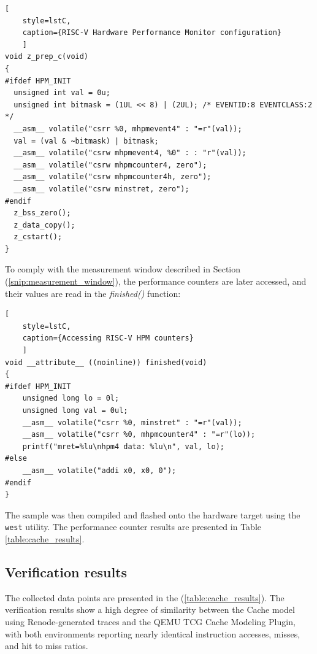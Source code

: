 \begin{center}
\centering
\begin{minipage}{\linewidth}
\begin{lstlisting}[
	style=lstC,
    caption={RISC-V Hardware Performance Monitor configuration}
    ]
void z_prep_c(void)
{
#ifdef HPM_INIT
  unsigned int val = 0u;
  unsigned int bitmask = (1UL << 8) | (2UL); /* EVENTID:8 EVENTCLASS:2 */
  __asm__ volatile("csrr %0, mhpmevent4" : "=r"(val));
  val = (val & ~bitmask) | bitmask;
  __asm__ volatile("csrw mhpmevent4, %0" : : "r"(val));
  __asm__ volatile("csrw mhpmcounter4, zero");
  __asm__ volatile("csrw mhpmcounter4h, zero");
  __asm__ volatile("csrw minstret, zero");
#endif
  z_bss_zero();
  z_data_copy();
  z_cstart();
}
\end{lstlisting}
\end{minipage}
\end{center}

\noindent To comply with the measurement window described in Section (\ref{snip:measurement_window}), the performance counters are later accessed, and their values are read in the
\textit{finished()} function:

\begin{center}
\centering
\begin{minipage}{\linewidth}
\begin{lstlisting}[
	style=lstC,
    caption={Accessing RISC-V HPM counters}
    ]
void __attribute__ ((noinline)) finished(void)
{
#ifdef HPM_INIT
    unsigned long lo = 0l;
    unsigned long val = 0ul;
    __asm__ volatile("csrr %0, minstret" : "=r"(val));
    __asm__ volatile("csrr %0, mhpmcounter4" : "=r"(lo));
    printf("mret=%lu\nhpm4 data: %lu\n", val, lo);
#else
	__asm__ volatile("addi x0, x0, 0");
#endif
}
\end{lstlisting}
\end{minipage}
\end{center}

\noindent The sample was then compiled and flashed onto the hardware target using the \texttt{west} utility. The performance counter results are presented in Table \ref{table:cache_results}.

\subsection{Verification results}

The collected data points are presented in the (\ref{table:cache_results}). The verification results show a high degree of similarity between the Cache model using Renode-generated
traces and the QEMU TCG Cache Modeling Plugin, with both environments reporting nearly identical instruction accesses, misses, and hit to miss ratios.


